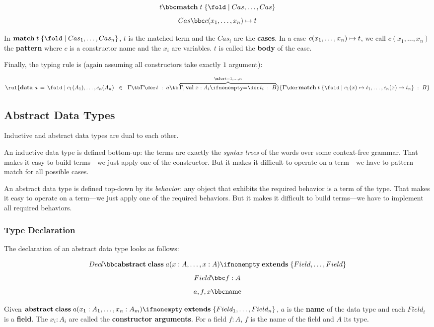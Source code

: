 \[t \bbc \amatchI{t}{Cas,\ldots,Cas}\]
\[Cas \bbc \acase{c(x_1,\ldots,x_n)}{t}\]

In $\amatchI{t}{Cas_1,\ldots,Cas_n}$, $t$ is the matched term and the $Cas_i$ are the \textbf{cases}.
In a case $c(x_1,\ldots,x_n) \mapsto t$, we call $c(x_1,\ldots,x_n)$ the \textbf{pattern} where $c$ is a constructor name and the $x_i$ are variables.
$t$ is called the \textbf{body} of the case.

Finally, the typing rule is (again assuming all constructors take exactly $1$ argument): 

\[\rul{\adata{a}{c_1(A_1),\ldots,c_n(A_n)}\;\;\in\;\;\Gamma \tb \oftype{}{\Gamma}{t}{a}\tb
       \overbrace{\oftype{}{\Gamma,\aval{x}{A_i}{}}{t_i}{B}}^{\mfor i=1,\ldots,n}}
      {\oftype{}{\Gamma}{\amatchI{t}{\acase{c_1(x)}{t_1},\ldots,\acase{c_n(x)}{t_n}}}{B}}\]


\subsection{Abstract Data Types}

Inductive and abstract data types are dual to each other.

An inductive data type is defined bottom-up: the terms are exactly the \emph{syntax trees} of the words over some context-free grammar.
That makes it easy to build terms---we just apply one of the constructor.
But it makes it difficult to operate on a term---we have to pattern-match for all possible cases.

An abstract data type is defined top-down by its \emph{behavior}: any object that exhibits the required behavior is a term of the type.
That makes it easy to operate on a term---we just apply one of the required behaviors.
But it makes it difficult to build terms---we have to implement all required behaviors.

\subsubsection{Type Declaration}

The declaration of an abstract data type looks as follows:

\[Decl \bbc \aclassAI{a}{x:A,\ldots,x:A}{}{Field,\ldots,Field}\]
\[Field \bbc f:A\]
\[a,f,x \bbc \text{name} \]

Given $\aclassAI{a}{x_1:A_1,\ldots,x_n:A_m}{}{Field_1,\ldots,Field_n}$, $a$ is the \textbf{name} of the data type and each $Field_i$ is a \textbf{field}.
The $x_i:A_i$ are called the \textbf{constructor arguments}.
For a field $f:A$, $f$ is the name of the field and $A$ its type.


